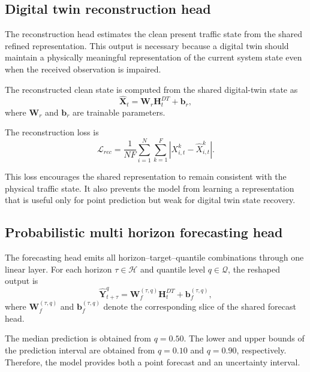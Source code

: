 \documentclass[pdflatex,sn-mathphys-num]{sn-jnl}%
\theoremstyle{thmstyleone}%
\theoremstyle{thmstyletwo}%
\theoremstyle{thmstylethree}%
\begin{document}
\subsection{Digital twin reconstruction head}
\label{subsec:reconstruction_head}

The reconstruction head estimates the clean present traffic state from the shared refined representation. This output is necessary because a digital twin should maintain a physically meaningful representation of the current system state even when the received observation is impaired.

The reconstructed clean state is computed from the shared digital-twin state as
\begin{equation}
    \widehat{\mathbf{X}}_{t}
    =
    \mathbf{W}_{r}
    \mathbf{H}^{DT}_{t}
    +
    \mathbf{b}_{r},
\end{equation}
where \(\mathbf{W}_{r}\) and \(\mathbf{b}_{r}\) are trainable parameters.

The reconstruction loss is
\begin{equation}
    \mathcal{L}_{rec}
    =
    \frac{1}{N F}
    \sum_{i=1}^{N}
    \sum_{k=1}^{F}
    \left|
    X_{i,t}^{k}
    -
    \widehat{X}_{i,t}^{k}
    \right|.
\end{equation}

This loss encourages the shared representation to remain consistent with the physical traffic state. It also prevents the model from learning a representation that is useful only for point prediction but weak for digital twin state recovery.

\subsection{Probabilistic multi horizon forecasting head}
\label{subsec:forecasting_head}

The forecasting head emits all horizon--target--quantile combinations through one linear layer. For each horizon \(\tau\in\mathcal{H}\) and quantile level \(q\in\mathcal{Q}\), the reshaped output is
\begin{equation}
    \widehat{\mathbf{Y}}_{t+\tau}^{q}
    =
    \mathbf{W}_{f}^{(\tau,q)}
    \mathbf{H}^{DT}_{t}
    +
    \mathbf{b}_{f}^{(\tau,q)},
\end{equation}
where \(\mathbf{W}_{f}^{(\tau,q)}\) and \(\mathbf{b}_{f}^{(\tau,q)}\) denote the corresponding slice of the shared forecast head.

The median prediction is obtained from \(q=0.50\). The lower and upper bounds of the prediction interval are obtained from \(q=0.10\) and \(q=0.90\), respectively. Therefore, the model provides both a point forecast and an uncertainty interval.
\end{document}
